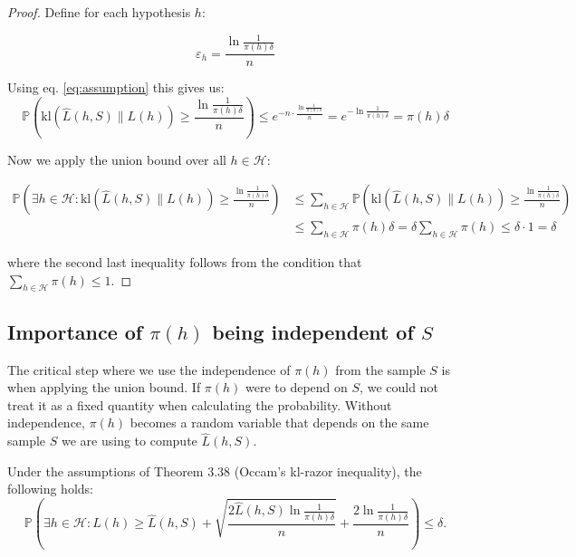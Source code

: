 \begin{proof}
Define for each hypothesis $h$:

\begin{equation*}
\varepsilon_h = \frac{\ln \frac{1}{\pi(h)\delta}}{n}
\end{equation*}

Using eq. \ref{eq:assumption} this gives us:
\begin{equation*}
\mathbb{P}\left(\text{kl}(\hat{L}(h,S)\|L(h)) \geq \frac{\ln \frac{1}{\pi(h)\delta}}{n}\right) \leq e^{-n \cdot \frac{\ln \frac{1}{\pi(h)\delta}}{n}} 
= e^{-\ln \frac{1}{\pi(h)\delta}} 
= \pi(h)\delta
\end{equation*}

Now we apply the union bound over all $h \in \mathcal{H}$:

\begin{align*}
\mathbb{P}\left(\exists h \in \mathcal{H} : \text{kl}(\hat{L}(h,S)\|L(h)) \geq \frac{\ln \frac{1}{\pi(h)\delta}}{n}\right) &\leq \sum_{h \in \mathcal{H}} \mathbb{P}\left(\text{kl}(\hat{L}(h,S)\|L(h)) \geq \frac{\ln \frac{1}{\pi(h)\delta}}{n}\right) \\
&\leq \sum_{h \in \mathcal{H}} \pi(h)\delta 
= \delta \sum_{h \in \mathcal{H}} \pi(h) 
\leq \delta \cdot 1 
= \delta
\end{align*}

where the second last inequality follows from the condition that $\sum_{h \in \mathcal{H}} \pi(h) \leq 1$.
\end{proof}


\subsection*{Importance of $\pi(h)$ being independent of $S$}

The critical step where we use the independence of $\pi(h)$ from the sample $S$ is when applying the union bound. If $\pi(h)$ were to depend on $S$, we could not treat it as a fixed quantity when calculating the probability. Without independence, $\pi(h)$ becomes a random variable that depends on the same sample $S$ we are using to compute $\hat{L}(h,S)$.


\begin{corollary}
Under the assumptions of Theorem 3.38 (Occam's kl-razor inequality), the following holds:
\begin{equation}
\mathbb{P}\left(\exists h \in \mathcal{H} : L(h) \geq \hat{L}(h, S) + \sqrt{\frac{2\hat{L}(h,S)\ln \frac{1}{\pi(h)\delta}}{n}} + \frac{2\ln \frac{1}{\pi(h)\delta}}{n}\right) \leq \delta.
\end{equation}
\end{corollary}

